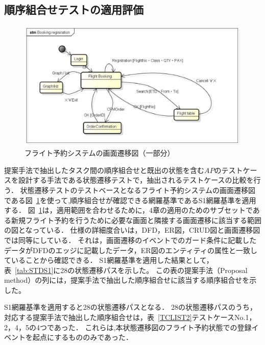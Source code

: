 \subsection{順序組合せテストの適用評価} \label{sec:5-2-2}
\begin{figure}[h]
\begin{center}
\includegraphics[scale=0.3]{./image/screentransition.eps}
\end{center}
\caption{フライト予約システムの画面遷移図（一部分）}
\label{fig:STD}
\end{figure}

提案手法で抽出したタスク間の順序組合せと既出の状態を含む$AP$のテストケースを設計する手法である状態遷移テストで，抽出されるテストケースの比較を行う．
状態遷移テストのテストベースとなるフライト予約システムの画面遷移図である図~\ref{fig:STD}を使って,順序組合せが確認できる網羅基準であるS1網羅基準を適用する．
図~\ref{fig:STD}は，適用範囲を合わせるために，4章の適用のためのサブセットである新規フライト予約を行うために必要な画面と隣接する画面遷移に該当する範囲の図となっている．
仕様の詳細度合いは，DFD，ER図，CRUD図と画面遷移図では同等にしている．
それは，画面遷移のイベントでのガード条件に記載したデータがDFDのエッジに記載したデータ，ER図のエンティティの属性と一致していることから確認できる．
S1網羅基準を適用した結果として，表~\ref{tab:STDS1}に28の状態遷移パスを示した。
この表の提案手法（Proposal method）の列には，提案手法で抽出した順序組合せに該当する順序組合せを示した。


S1網羅基準を適用すると28の状態遷移パスとなる．
28の状態遷移パスのうち，対応する提案手法で抽出した順序組合せは，表~\ref{TCLIST2}テストケースNo.1，2，4，5の4つであった．
これらは,本状態遷移図のフライト予約状態での登録イベントを起点にするもののみであった．








